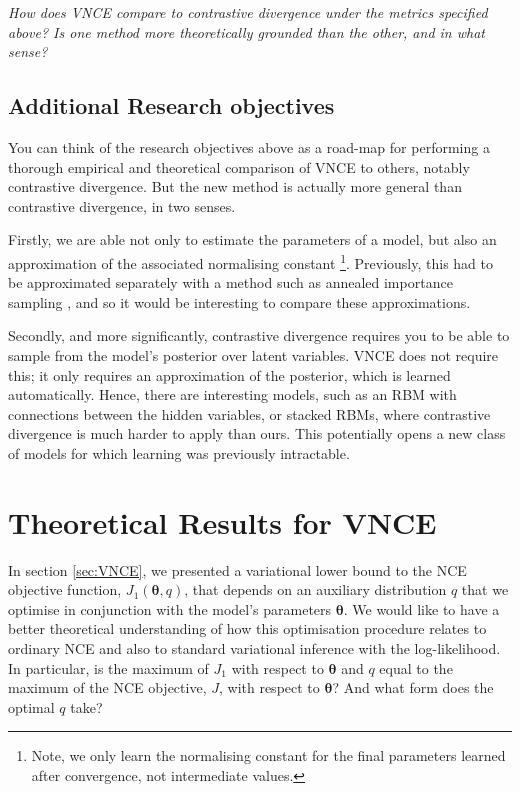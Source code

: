 \documentclass[11pt, oneside]{article}
\newcommand{\thetab}{{\boldsymbol{\theta}}}
\theoremstyle{definition}
\begin{document}
\vspace{2mm}
\noindent \emph{How does VNCE compare to contrastive divergence under the metrics specified above? Is one method more theoretically grounded than the other, and in what sense?}

\subsection{Additional Research objectives}
You can think of the research objectives above as a road-map for performing a thorough empirical and theoretical comparison of VNCE to others, notably contrastive divergence. But the new method is actually more general than contrastive divergence, in two senses.

Firstly, we are able not only to estimate the parameters of a model, but also an approximation of the associated normalising constant \footnote{Note, we only learn the normalising constant for the final parameters learned after convergence, not intermediate values.}. Previously, this had to be approximated separately with a method such as annealed importance sampling \citep{salakhutdinov2008quantitative}, and so it would be interesting to compare these approximations.

Secondly, and more significantly, contrastive divergence requires you to be able to sample from the model's posterior over latent variables. VNCE does not require this; it only requires an approximation of the posterior, which is learned automatically. Hence, there are interesting models, such as an RBM with connections between the hidden variables, or stacked RBMs, where contrastive divergence is much harder to apply than ours. This potentially opens a new class of models for which learning was previously intractable.

\newpage
\section{Theoretical Results for VNCE}
\label{sec:results}
In section \ref{sec:VNCE}, we presented a variational lower bound to the NCE objective function, $J_1(\thetab, q)$, that depends on an auxiliary distribution $q$ that we optimise in conjunction with the model's parameters $\thetab$. We would like to have a better theoretical understanding of how this optimisation procedure relates to ordinary NCE and also to standard variational inference with the log-likelihood. In particular, is the maximum of $J_1$ with respect to $\thetab$ and $q$ equal to the maximum of the NCE objective, $J$, with respect to $\thetab$? And what form does the optimal $q$ take? 
\end{document}
